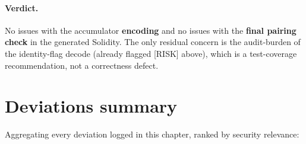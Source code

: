 \paragraph{Verdict.} No issues with the accumulator \textbf{encoding}
and no issues with the \textbf{final pairing check} in the generated
Solidity. The only residual concern is the audit-burden of the
identity-flag decode (already flagged [RISK] above), which is a
test-coverage recommendation, not a correctness defect.

\section{Deviations summary}
\label{sec:deviations-summary}

Aggregating every deviation logged in this chapter, ranked by security
relevance:

